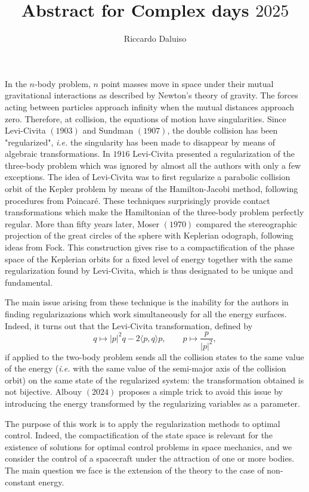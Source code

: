 \documentclass{article}
\title{Abstract for Complex days $2025$}
\author{Riccardo Daluiso}
\begin{document}
\maketitle

\section*{}

In the $n$-body problem, $n$ point masses move in space under their mutual gravitational interactions as described by Newton's theory of gravity. The forces acting between particles approach infinity when the mutual distances approach zero. Therefore, at collision, the equations of motion have singularities. Since Levi-Civita $(1903)$ and Sundman $(1907)$, the double collision has been "regularized", \emph{i.e.} the singularity has been made to disappear by means of algebraic transformations. In $1916$ Levi-Civita presented a regularization of the three-body problem which was ignored by almost all the authors with only a few exceptions. The idea of Levi-Civita was to first regularize a parabolic collision orbit of the Kepler problem by means of the Hamilton-Jacobi method, following procedures from Poincaré. These techniques surprisingly provide contact transformations which make the Hamiltonian of the three-body problem perfectly regular. 
More than fifty years later, Moser $(1970)$ compared the stereographic projection of the great circles of the sphere with Keplerian odograph, following ideas from Fock. This construction gives rise to a compactification of the phase space of the Keplerian orbits for a fixed level of energy together with the same regularization found by Levi-Civita, which is thus designated to be unique and fundamental. 

The main issue arising from these technique is the inability for the authors in finding regularizazions which work simultaneously for all the energy surfaces. Indeed, it turns out that the Levi-Civita transformation, defined by
\[
q \mapsto |p|^2q - 2 \langle  p , q \rangle p, \qquad p \mapsto \frac{p}{|p|^2},
\]
 if applied to the two-body problem sends all the collision states to the same value of the energy (\emph{i.e.} with the same value of the semi-major axis of the collision orbit) on the same state of the regularized system: the transformation obtained is not bijective. Albouy $(2024)$ proposes a simple trick to avoid this issue by introducing the energy transformed by the regularizing variables as a parameter. 

The purpose of this work is to apply the regularization methods to optimal control. Indeed, the compactification of the state space is relevant for the existence of solutions for optimal control problems in space mechanics, and we 
 consider the control of a spacecraft under the attraction of one or more bodies. The main question we face is the extension of the theory to the case of non-constant energy.
 
\end{document}
